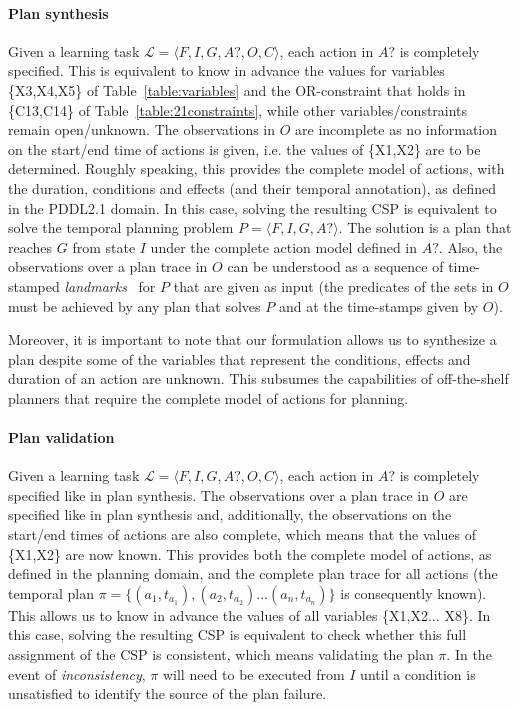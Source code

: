 \documentclass{ecai}
\newcommand{\tup}[1]{{\langle #1 \rangle}}
\begin{document}
\paragraph{Plan synthesis}

Given a learning task $\mathcal{L}=\tup{F,I,G,A?,O,C}$, each action in $A?$ is completely specified.
This is equivalent to know in advance the values for variables \{X3,X4,X5\} of Table~\ref{table:variables} and the OR-constraint that holds in \{C13,C14\} of Table~\ref{table:21constraints}, while other variables/constraints remain open/unknown. The observations in $O$ are incomplete as no information on the start/end time of actions is given, i.e. the values of \{X1,X2\} are to be determined.
Roughly speaking, this provides the complete model of actions, with the duration, conditions and effects (and their temporal annotation), as defined in the PDDL2.1 domain.
In this case, solving the resulting CSP is equivalent to solve the temporal planning problem $P=\tup{F,I,G,A?}$. The solution is a plan that reaches $G$ from state $I$ under the complete action model defined in $A?$. 
Also, the observations over a plan trace in $O$ can be understood as a sequence of time-stamped {\em landmarks}~\cite{hoffmann2004ordered} for $P$ that are given as input (the predicates of the sets in $O$ must be achieved by any plan that solves $P$ and at the time-stamps given by $O$).

Moreover, it is important to note that our formulation allows us to synthesize a plan despite some of the variables that represent the conditions, effects and duration of an action are unknown. This subsumes the capabilities of off-the-shelf planners that require the complete model of actions for planning.


\paragraph{Plan validation}

Given a learning task $\mathcal{L}=\tup{F,I,G,A?,O,C}$, each action in $A?$ is completely specified like in plan synthesis. The observations over a plan trace in $O$ are specified like in plan synthesis and, additionally, the observations on the start/end times of actions are also complete, which means that the values of \{X1,X2\} are now known.
This provides both the complete model of actions, as defined in the planning domain, and the complete plan trace for all actions (the temporal plan $\pi=\{(a_1,t_{a_1}),(a_2,t_{a_2})\ldots (a_n,t_{a_n})\}$ is consequently known). This allows us to know in advance the values of all variables \{X1,X2$\ldots$ X8\}.
In this case, solving the resulting CSP is equivalent to check whether this full assignment of the CSP is consistent, which means validating the plan $\pi$. In the event of {\em inconsistency}, $\pi$ will need to be executed from $I$ until a condition is unsatisfied to identify the source of the plan failure.
\end{document}
